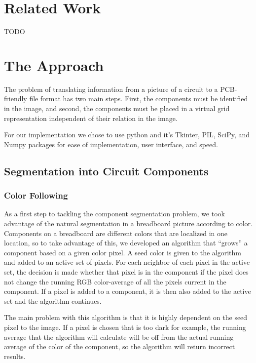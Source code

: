 \documentclass[10pt,twocolumn,letterpaper]{article}
\begin{document}
\section{Related Work}

TODO

\section{The Approach}

The problem of translating information from a picture of a circuit to a
PCB-friendly file format has two main steps. First, the components must be
identified in the image, and second, the components must be placed in a virtual
grid representation independent of their relation in the image. 

For our implementation we chose to use python and it's Tkinter, PIL, SciPy, and
Numpy packages for ease of implementation, user interface, and speed. 

\subsection{Segmentation into Circuit Components}

\subsubsection{Color Following}

As a first step to tackling the component segmentation problem, we took
advantage of the natural segmentation in a breadboard picture according to
color. Components on a breadboard are different colors that are localized in
one location, so to take advantage of this, we developed an algorithm that
``grows'' a component based on a given color pixel. A seed color is given to
the algorithm and added to an active set of pixels. For each neighbor of each
pixel in the active set, the decision is made whether that pixel is in the
component if the pixel does not change the running RGB color-average of all the
pixels current in the component. If a pixel is added to a component, it is then
also added to the active set and the algorithm continues.     

The main problem with this algorithm is that it is highly dependent on the seed
pixel to the image. If a pixel is chosen that is too dark for example, the
running average that the algorithm will calculate will be off from the actual
running average of the color of the component, so the algorithm will return
incorrect results.   
\end{document}
